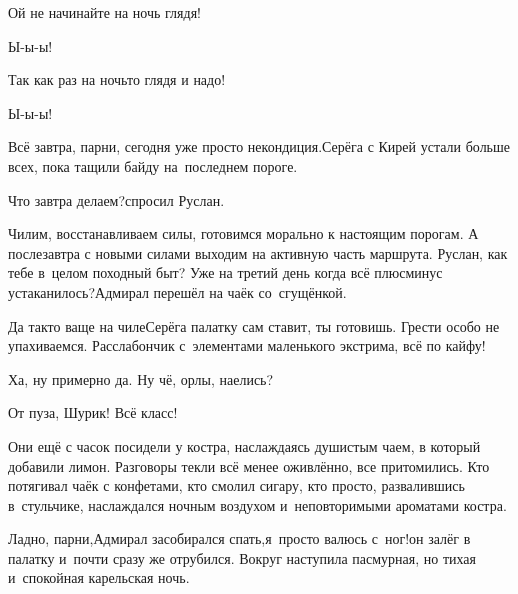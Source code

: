 \diagdash Ой не начинайте на ночь глядя!

\diagdash Ы-ы-ы!

\diagdash Так как раз на ночь\sdash то глядя и надо!

\diagdash Ы-ы-ы!

\diagdash Всё завтра, парни, сегодня уже просто некондиция.\mdash Серёга с Кирей устали больше всех, пока тащили байду на~последнем пороге.

\diagdash Что завтра делаем?\mdash спросил Руслан.

\diagdash Чилим, восстанавливаем силы, готовимся морально к настоящим порогам. А послезавтра с новыми силами выходим на активную часть маршрута. Руслан, как тебе в~целом походный быт? Уже на третий  день когда всё плюс\sdash минус устаканилось?\mdash Адмирал перешёл на чаёк со~сгущёнкой.

\diagdash Да так\sdash то ваще на чиле\mdash Серёга палатку сам ставит, ты готовишь. Грести особо не упахиваемся. Расслабончик с~элементами маленького экстрима, всё по кайфу!

\diagdash Ха, ну примерно да. Ну чё, орлы, наелись?

\diagdash От пуза, Шурик! Всё класс!

Они ещё с часок посидели у костра, наслаждаясь душистым чаем, в который добавили лимон. Разговоры текли всё менее оживлённо, все притомились. Кто потягивал чаёк с конфетами, кто смолил сигару, кто просто, развалившись в~стульчике, наслаждался ночным воздухом и~неповторимыми ароматами костра.

\diagdash Ладно, парни,\mdash Адмирал засобирался спать,\mdash я~просто валюсь с~ног!\mdash он залёг в палатку и~почти сразу же отрубился. Вокруг наступила пасмурная, но тихая и~спокойная карельская ночь.


\vspace{-0.2cm}
\begin{center}
\end{center}
